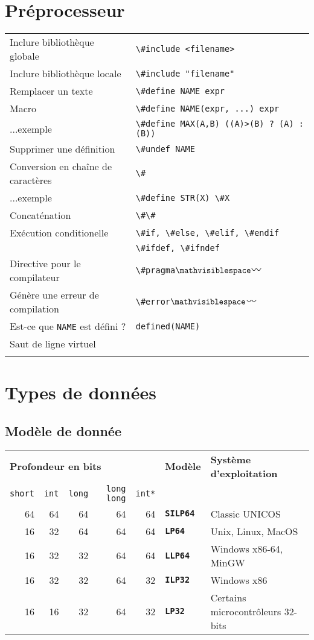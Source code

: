 \documentclass{article}
\newcommand{\any}{$\hzigzag$~}
\newcommand{\spc}{$\mathvisiblespace$}
\newcommand{\cd}{\lstinline}
\begin{document}
\begin{multicols*}{3}
\section*{Préprocesseur}
\begin{tabularx}{\linewidth}{Xl}
  Inclure bibliothèque globale       & \cd{\#include <filename>} \\
  Inclure bibliothèque locale        & \cd{\#include "filename"} \\
  Remplacer un texte                 & \cd{\#define NAME expr} \\
  Macro                              & \cd{\#define NAME(expr, ...) expr} \\
  ...exemple                         & \cd{\#define MAX(A,B) ((A)>(B) ? (A) : (B))} \\
  Supprimer une définition           & \cd{\#undef NAME} \\
  Conversion en chaîne de caractères & \cd{\#} \\
  ...exemple                         & \cd{\#define STR(X) \#X} \\
  Concaténation                      & \cd{\#\#} \\
  Exécution conditionelle            & \cd{\#if, \#else, \#elif, \#endif} \\
                                     & \cd{\#ifdef, \#ifndef} \\
  Directive pour le compilateur      & \cd{\#pragma}\tt\spc \any \\
  Génère une erreur de compilation   & \cd{\#error}\tt\spc \any \\
  Est-ce que \cd{NAME} est défini ?  & \cd{defined(NAME)} \\
  Saut de ligne virtuel              & \cd{\\}
\end{tabularx}

\section*{Types de données}

\subsection*{Modèle de donnée}
\begin{tabularx}{\linewidth}{r|r|r|r|r|l|X}
  \multicolumn{5}{l|}{\bf Profondeur en bits} & \bf Modèle & \bf Système d'exploitation \\
  \cd {short} & \cd{int} & \cd{long} & \cd{long long} & \cd{int*} & & \\
  \hline
  64 & 64 & 64 & 64 & 64 & \bf \tt SILP64 & Classic UNICOS\\
  16 & 32 & 64 & 64 & 64 & \bf \tt LP64   & Unix, Linux, MacOS \\
  16 & 32 & 32 & 64 & 64 & \bf \tt LLP64  & Windows x86-64, MinGW \\
  16 & 32 & 32 & 64 & 32 & \bf \tt ILP32  & Windows x86 \\
  16 & 16 & 32 & 64 & 32 & \bf \tt LP32   & Certains microcontrôleurs 32-bits\\
\end{tabularx}


\end{multicols*}
\end{document}
